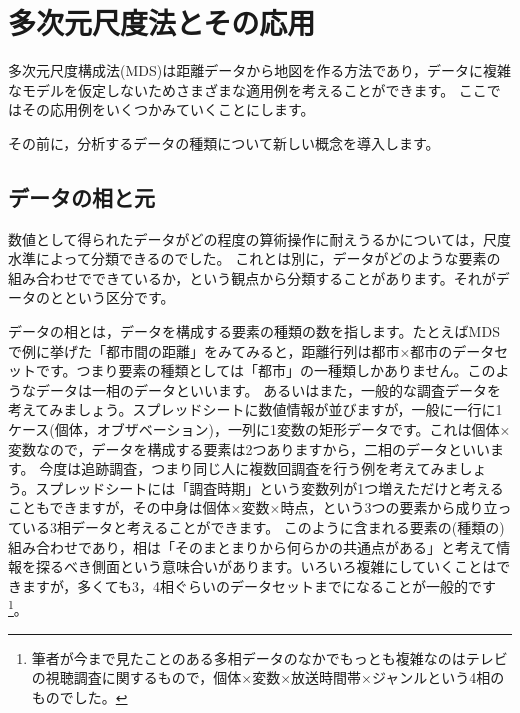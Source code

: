 \documentclass{ltjsbook}
\begin{document}
\chapter{多次元尺度法とその応用}
\label{H08_MDS}
多次元尺度構成法(MDS)は距離データから地図を作る方法であり，データに複雑なモデルを仮定しないためさまざまな適用例を考えることができます。
ここではその応用例をいくつかみていくことにします。

その前に，分析するデータの種類について新しい概念を導入します。

\section{データの相と元}

数値として得られたデータがどの程度の算術操作に耐えうるかについては，尺度水準によって分類できるのでした。
これとは別に，データがどのような要素の組み合わせでできているか，という観点から分類することがあります。それがデータのとという区分です。

データの相とは，データを構成する要素の種類の数を指します。たとえばMDSで例に挙げた「都市間の距離」をみてみると，距離行列は都市$\times$都市のデータセットです。つまり要素の種類としては「都市」の一種類しかありません。このようなデータは一相のデータといいます。
あるいはまた，一般的な調査データを考えてみましょう。スプレッドシートに数値情報が並びますが，一般に一行に1ケース(個体，オブザベーション)，一列に1変数の矩形データです。これは個体$\times$変数なので，データを構成する要素は2つありますから，二相のデータといいます。
今度は追跡調査，つまり同じ人に複数回調査を行う例を考えてみましょう。スプレッドシートには「調査時期」という変数列が1つ増えただけと考えることもできますが，その中身は個体$\times$変数$\times$時点，という3つの要素から成り立っている3相データと考えることができます。
このように含まれる要素の(種類の)組み合わせであり，相は「そのまとまりから何らかの共通点がある」と考えて情報を探るべき側面という意味合いがあります。いろいろ複雑にしていくことはできますが，多くても3，4相ぐらいのデータセットまでになることが一般的です\footnote{筆者が今まで見たことのある多相データのなかでもっとも複雑なのはテレビの視聴調査に関するもので，個体$\times$変数$\times$放送時間帯$\times$ジャンルという4相のものでした。}。
\end{document}
